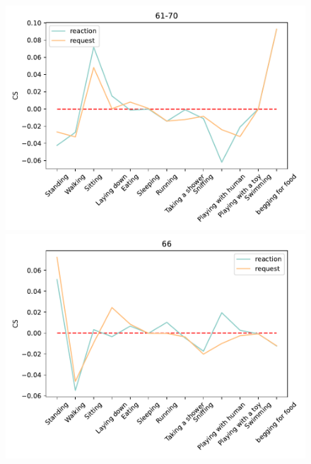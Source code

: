 \begin{figure}[ht]
		\centering
					\begin{minipage}[b]{.3\linewidth}
		\centering
		\includegraphics[width=0.99\linewidth]{./35word/61-70.pdf}
	\end{minipage}
	\begin{minipage}[b]{.3\linewidth}
		\centering
		\includegraphics[width=0.99\linewidth]{./35word/66.pdf}
	\end{minipage}
	\begin{minipage}[b]{.3\linewidth}
		\centering

\end{minipage}
\end{figure}
